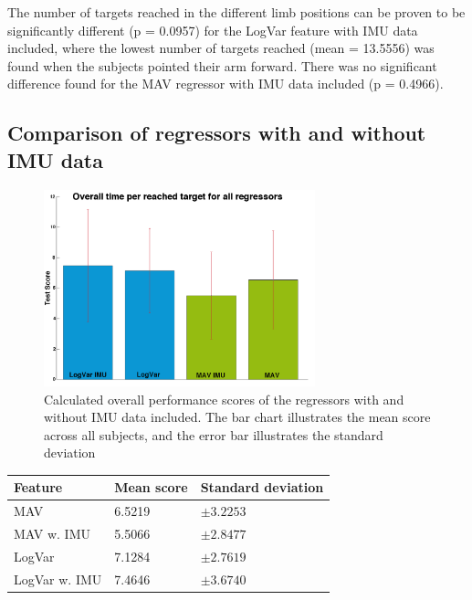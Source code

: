The number of targets reached in the different limb positions can be proven to be significantly different (p = 0.0957) for the LogVar feature with IMU data included, where the lowest number of targets reached (mean = 13.5556) was found when the subjects pointed their arm forward. There was no significant difference found for the MAV regressor with IMU data included (p = 0.4966).
	
\subsection{Comparison of regressors with and without IMU data}

\begin{figure}[H]
	\includegraphics[width=0.7\textwidth]{figures/results/allRegressorBarzTimeScoreForTargetTest}  %
	\caption{Calculated overall performance scores of the regressors with and without IMU data included. The bar chart illustrates the mean score across all subjects, and the error bar illustrates the standard deviation}
	\label{fig:gotItTimeOverall}  %
\end{figure}

\begin{center}
	\begin{tabular}{l l l}
		\toprule
		\textbf{Feature} & \textbf{Mean score} & \textbf{Standard deviation}\\
		\midrule
		MAV & 6.5219 & $\pm 3.2253$ \\
		MAV w. IMU & 5.5066 & $\pm 2.8477$ \\
		LogVar & 7.1284 & $\pm 2.7619$ \\
		LogVar w. IMU & 7.4646 & $\pm 3.6740$ \\
		\bottomrule
	\end{tabular}
\end{center}

